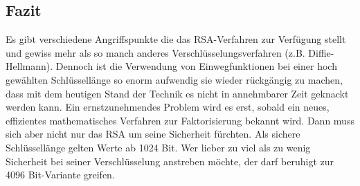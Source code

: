 \subsection{Fazit}
Es gibt verschiedene Angriffspunkte die das RSA-Verfahren zur Verfügung stellt
und gewiss mehr als so manch anderes Verschlüsselungsverfahren (z.B.
Diffie-Hellmann). Dennoch ist die Verwendung von Einwegfunktionen bei einer hoch
gewählten Schlüssellänge so enorm aufwendig sie wieder rückgängig zu machen,
dass mit dem heutigen Stand der Technik es nicht in annehmbarer Zeit geknackt
werden kann. Ein ernstzunehmendes Problem wird es erst, sobald ein neues,
effizientes mathematisches Verfahren zur Faktorisierung bekannt wird. Dann muss
sich aber nicht nur das RSA um seine Sicherheit fürchten. 
Als sichere Schlüssellänge gelten Werte ab 1024 Bit. Wer lieber zu viel als zu
wenig Sicherheit bei seiner Verschlüsselung anstreben möchte, der darf beruhigt
zur 4096 Bit-Variante greifen.
